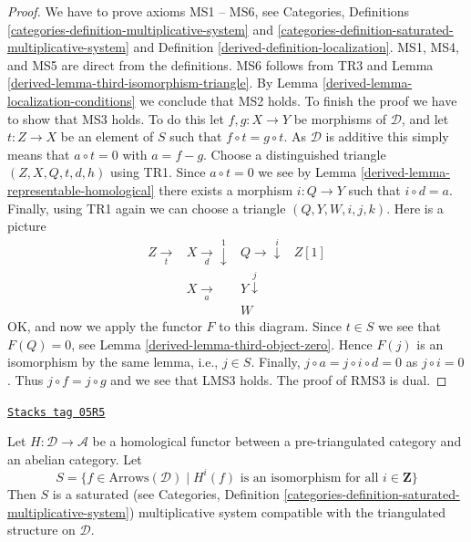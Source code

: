 \begin{proof}

We have to prove axioms MS1 -- MS6, see
Categories, Definitions \ref{categories-definition-multiplicative-system} and
\ref{categories-definition-saturated-multiplicative-system}
and
Definition \ref{derived-definition-localization}.
MS1, MS4, and MS5 are direct from the definitions. MS6 follows from TR3 and
Lemma \ref{derived-lemma-third-isomorphism-triangle}.
By
Lemma \ref{derived-lemma-localization-conditions}
we conclude that MS2 holds. To finish the proof we have to show that
MS3 holds. To do this let $f, g : X \to Y$ be morphisms of $\mathcal{D}$,
and let $t : Z \to X$ be an element of $S$ such that $f \circ t = g \circ t$.
As $\mathcal{D}$ is additive this simply means that $a \circ t = 0$ with
$a = f - g$. Choose a distinguished triangle $(Z, X, Q, t, d, h)$ using TR1.
Since $a \circ t = 0$ we see by
Lemma \ref{derived-lemma-representable-homological}
there exists a morphism $i : Q \to Y$ such that $i \circ d = a$.
Finally, using TR1 again we can choose a triangle
$(Q, Y, W, i, j, k)$. Here is a picture
$$
\begin{array}{cccc}Z \underset{t}{\longrightarrow} & X \underset{d}{\longrightarrow}\overset{1}{\downarrow} & Q \longrightarrow\overset{i}{\downarrow} & Z[1] \\  & X \underset{a}{\longrightarrow} & Y \overset{j}{\downarrow} &  \\  &  & W & \end{array}
$$
OK, and now we apply the functor $F$ to this diagram.
Since $t \in S$ we see that $F(Q) = 0$, see
Lemma \ref{derived-lemma-third-object-zero}.
Hence $F(j)$ is an isomorphism by the same lemma, i.e., $j \in S$.
Finally, $j \circ a = j \circ i \circ d = 0$ as $j \circ i = 0$.
Thus $j \circ f = j \circ g$ and we see that LMS3 holds.
The proof of RMS3 is dual.
\end{proof}

\begin{lemma}
\label{derived-lemma-homological-functor-localize}
\href{https://stacks.math.columbia.edu/tag/05R5}{\texttt{Stacks tag 05R5}}

Let $H : \mathcal{D} \to \mathcal{A}$ be a homological functor between a
pre-triangulated category and an abelian category. Let
$$
S = \{f \in \text{Arrows}(\mathcal{D})
\mid H^i(f)\text{ is an isomorphism for all }i \in \mathbf{Z}\}
$$
Then $S$ is a saturated (see
Categories,
Definition \ref{categories-definition-saturated-multiplicative-system})
multiplicative system compatible with the
triangulated structure on $\mathcal{D}$.
\end{lemma}

